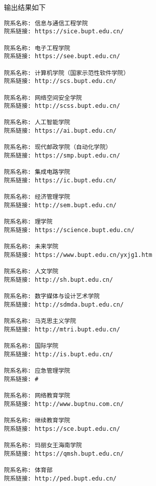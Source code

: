 \documentclass[lang=cn,11pt,a4paper]{elegantpaper}
\begin{document}
输出结果如下
\begin{lstlisting}[language=text]
院系名称: 信息与通信工程学院
院系链接: https://sice.bupt.edu.cn/

院系名称: 电子工程学院
院系链接: https://see.bupt.edu.cn/

院系名称: 计算机学院（国家示范性软件学院）
院系链接: http://scs.bupt.edu.cn/

院系名称: 网络空间安全学院
院系链接: http://scss.bupt.edu.cn/

院系名称: 人工智能学院
院系链接: https://ai.bupt.edu.cn/

院系名称: 现代邮政学院（自动化学院）
院系链接: https://smp.bupt.edu.cn/

院系名称: 集成电路学院
院系链接: https://ic.bupt.edu.cn/

院系名称: 经济管理学院
院系链接: http://sem.bupt.edu.cn/

院系名称: 理学院
院系链接: https://science.bupt.edu.cn/

院系名称: 未来学院
院系链接: https://www.bupt.edu.cn/yxjg1.htm

院系名称: 人文学院
院系链接: http://sh.bupt.edu.cn/

院系名称: 数字媒体与设计艺术学院
院系链接: http://sdmda.bupt.edu.cn/

院系名称: 马克思主义学院
院系链接: http://mtri.bupt.edu.cn/

院系名称: 国际学院
院系链接: http://is.bupt.edu.cn/

院系名称: 应急管理学院
院系链接: #

院系名称: 网络教育学院
院系链接: http://www.buptnu.com.cn/

院系名称: 继续教育学院
院系链接: https://sce.bupt.edu.cn/

院系名称: 玛丽女王海南学院
院系链接: https://qmsh.bupt.edu.cn/

院系名称: 体育部
院系链接: http://ped.bupt.edu.cn/

\end{lstlisting}



\end{document}
